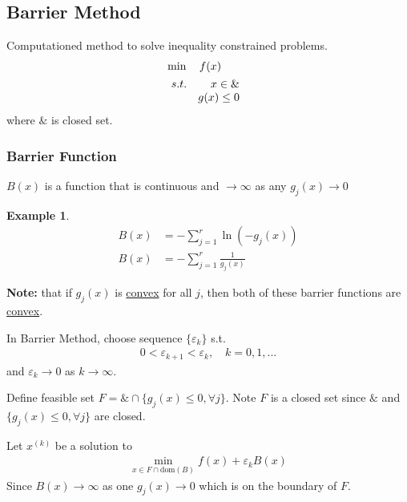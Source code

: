 \documentclass[11pt,a4paper]{article}
\newtheorem{example}{Example}
\begin{document}
\subsection{Barrier Method}
Computationed method to solve inequality constrained problems.
\begin{align*}
    &\min\quad f(x)\\
    &\begin{array}{r@{\quad}r@{}l@{\quad}l}
    s.t.
    &x\in\&&\\
    &g(x)\leq 0&\\
\end{array}
\end{align*}
where $\&$ is closed set.
\subsubsection*{Barrier Function}
$B(x)$ is a function that is continuous and $\rightarrow \infty$ as any $g_j(x) \rightarrow	0$
\begin{example}

    \begin{equation}
        \begin{aligned}
            B(x)&=-\sum_{j=1}^r\ln(-g_j(x))\\
            B(x)&=-\sum_{j=1}^r\frac{1}{g_j(x)}
        \end{aligned}
        \nonumber
    \end{equation}

\end{example}
\textbf{Note:} that if $g_j(x)$ is \underline{convex} for all $j$, then both of these barrier functions are \underline{convex}.

In Barrier Method, choose sequence $\{\varepsilon_k\}$ s.t.
\begin{equation}
    \begin{aligned}
        0<\varepsilon_{k+1}<\varepsilon_k,\quad k=0,1,...
    \end{aligned}
    \nonumber
\end{equation}
and $\varepsilon_k \rightarrow 0$ as $k \rightarrow	\infty$.

Define feasible set $F=\&\cap\{g_j(x)\leq 0,\forall j\}$. Note $F$ is a closed set since $\&$ and $\{g_j(x)\leq 0,\forall j\}$ are closed.

Let $x^{(k)}$ be a solution to
\begin{equation}
    \begin{aligned}
        \min_{x\in F\cap \text{dom}(B)}f(x)+\varepsilon_k B(x)
    \end{aligned}
    \nonumber
\end{equation}
Since $B(x) \rightarrow	\infty$ as one $g_j(x) \rightarrow	0$ which is on the boundary of $F$.
\end{document}
